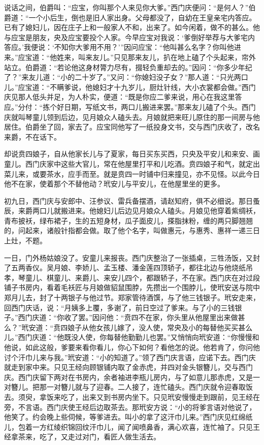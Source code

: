 说话之间，伯爵叫：“应宝，你叫那个人来见你大爹。”西门庆便问：“是何人？”伯爵道：“一个小后生，倒也是旧人家出身。父母都没了，自幼在王皇亲宅内答应。已有了媳妇儿，因在庄子上和一般家人不和，出来了。如今闲着，做不的甚么。他与应宝是朋友，央及应宝要投个人家。今早应宝对我说：‘爹倒好举荐与大爹宅内答应。’我便说：‘不知你大爹用不用？’”因问应宝：“他叫甚么名字？你叫他进来。”应宝道：“他姓来，叫来友儿。”只见那来友儿，扒在地上磕了个头起来，帘外站立。伯爵道：“若论他这身材膂力尽有，掇轻负重却去的。”因问：“你多少年纪了？”来友儿道：“小的二十岁了。”又问：“你媳妇没子女？”那人道：“只光两口儿。”应宝道：“不瞒爹说，他媳妇才十九岁儿，厨灶针线，大小衣裳都会做。”西门庆见那人低头并足，为人朴实，便道：“既是你应二爹来说，用心在我这里答应。”分付：“拣个好日期，写纸文书，两口儿搬进来罢。”那来友儿磕了个头。西门庆就叫琴童儿领到后边，见月娘众人磕头去。月娘就把来旺儿原住的那一间房与他居住。伯爵坐了回，家去了。应宝同他写了一纸投身文书，交与西门庆收了，改名来爵，不在话下。

却说贲四娘子，自从他家长儿与了夏家，每日买东买西，只央及平安儿和来安、画童儿。西门庆家中这些大官儿，常在他屋里打平和儿吃酒。贲四娘子和气，就定出菜儿来，或要茶水，应手而至。就是贲四一时铺中归来撞见，亦不见怪。以此今日他不在家，使着那个不替他动？玳安儿与平安儿，在他屋里坐的更多。

初九日，西门庆与安郎中、汪参议、雷兵备摆酒，请赵知府，俱不必细说。那日蚤辰，来爵两口儿就搬进来。他媳妇儿后边见月娘众人磕头。月娘见他穿着紫绸袄，青布披袄，绿布裙子，生的五短身材，瓜子面皮儿，搽脂抹粉，缠的两只脚翘翘的，问起来，诸般针指都会做。取了他个名字，叫做惠元，与惠秀、惠祥一递三日上灶，不题。

一日，门外杨姑娘没了。安童儿来报丧。西门庆整治了一张插桌，三牲汤饭，又封了五两香仪。吴月娘、李娇儿、孟玉楼、潘金莲四顶轿子，都往北边与他烧纸吊孝，琴童儿、棋童儿、来爵儿、来安儿四个，都跟轿子，不在家。西门庆在对过段铺子书房内，看着毛袄匠与月娘做貂鼠围脖，先攒出一个围脖儿，使玳安送与院中郑月儿去，封了十两银子与他过节。郑家管待酒馔，与了他三钱银子。玳安走来，回西门庆话，说：“月姨多上覆，多谢了，前日空过了爹来。与了小的三钱银子。”西门庆道：“你收了罢。”因问他：“贲四不在家，你头里从他屋里出来做甚么？”玳安道：“贲四娘子从他女孩儿嫁了，没人使，常央及小的每替他买买甚么儿。”西门庆道：“他既没人使，你每替他勤勤儿也罢。”又悄悄向玳安道：“你慢慢和他说，如此这般，爹要来看你看儿，你心下如何？看他怎的说。他若肯了，你问他讨个汗巾儿来与我。”玳安道：“小的知道了。”领了西门庆言语，应诺下去。西门庆就走到家中来。只见王经向顾银铺内取了金赤虎，并四对金头银簪儿，交与西门庆。西门庆留下两对在书房内，余者袖进李瓶儿房内，与了如意儿那赤虎，又是一对簪儿。把那一对簪儿就与了迎春。二人接了，连忙磕头。西门庆就令迎春取饭去。须臾，拿饭来吃了，出来又到书房内坐下。只见玳安慢慢走到跟前，见王经在旁，不言语。西门庆使王经后边取茶去。那玳安方说：“小的将爹言语对他说了，他笑了。约会晚上些伺候，等爹进去。叫小的拿了这汗巾儿来。”西门庆见红绵纸儿，包着一方红绫织锦回纹汗巾儿，闻了闻喷鼻香，满心欢喜，连忙袖了。只见王经拿茶来，吃了，又走过对门，看匠人做生活去。

